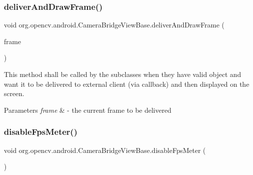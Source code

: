 \subsubsection{\texorpdfstring{deliver\+And\+Draw\+Frame()}{deliverAndDrawFrame()}}
{\footnotesize\ttfamily void org.\+opencv.\+android.\+Camera\+Bridge\+View\+Base.\+deliver\+And\+Draw\+Frame (\begin{DoxyParamCaption}\item[{\mbox{\hyperlink{interfaceorg_1_1opencv_1_1android_1_1_camera_bridge_view_base_1_1_cv_camera_view_frame}{Cv\+Camera\+View\+Frame}}}]{frame }\end{DoxyParamCaption})\hspace{0.3cm}{\ttfamily [protected]}}

This method shall be called by the subclasses when they have valid object and want it to be delivered to external client (via callback) and then displayed on the screen. 
\begin{DoxyParams}{Parameters}
{\em frame} & -\/ the current frame to be delivered \\
\hline
\end{DoxyParams}
\mbox{\label{classorg_1_1opencv_1_1android_1_1_camera_bridge_view_base_a8b57f5b10201788b0d53a7c85f5f2739}} 
\subsubsection{\texorpdfstring{disable\+Fps\+Meter()}{disableFpsMeter()}}
{\footnotesize\ttfamily void org.\+opencv.\+android.\+Camera\+Bridge\+View\+Base.\+disable\+Fps\+Meter (\begin{DoxyParamCaption}{ }\end{DoxyParamCaption})}

\mbox{\label{classorg_1_1opencv_1_1android_1_1_camera_bridge_view_base_ab77aa314d6159042eff12ff5bffc5839}} 
